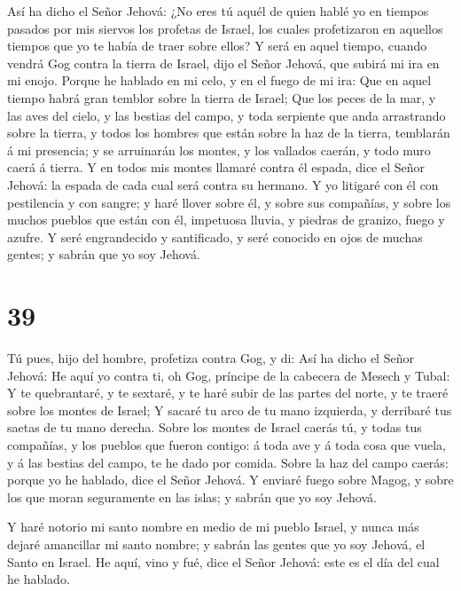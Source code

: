 Así ha dicho el Señor Jehová: ¿No eres tú aquél de quien
hablé yo en tiempos pasados por mis siervos los profetas de Israel, los
cuales profetizaron en aquellos tiempos que yo te había de traer sobre
ellos?  Y será en aquel tiempo, cuando vendrá Gog contra la
tierra de Israel, dijo el Señor Jehová, que subirá mi ira en mi enojo.
 Porque he hablado en mi celo, y en el fuego de mi ira: Que
en aquel tiempo habrá gran temblor sobre la tierra de Israel;
 Que los peces de la mar, y las aves del cielo, y las
bestias del campo, y toda serpiente que anda arrastrando sobre la
tierra, y todos los hombres que están sobre la haz de la tierra,
temblarán á mi presencia; y se arruinarán los montes, y los vallados
caerán, y todo muro caerá á tierra.  Y en todos mis montes
llamaré contra él espada, dice el Señor Jehová: la espada de cada cual
será contra su hermano.  Y yo litigaré con él con
pestilencia y con sangre; y haré llover sobre él, y sobre sus compañías,
y sobre los muchos pueblos que están con él, impetuosa lluvia, y piedras
de granizo, fuego y azufre.  Y seré engrandecido y
santificado, y seré conocido en ojos de muchas gentes; y sabrán que yo
soy Jehová.

\hypertarget{section-38}{%
\section{39}\label{section-38}}

 Tú pues, hijo del hombre, profetiza contra Gog, y di: Así
ha dicho el Señor Jehová: He aquí yo contra ti, oh Gog, príncipe de la
cabecera de Mesech y Tubal:  Y te quebrantaré, y te sextaré,
y te haré subir de las partes del norte, y te traeré sobre los montes de
Israel;  Y sacaré tu arco de tu mano izquierda, y derribaré
tus saetas de tu mano derecha.  Sobre los montes de Israel
caerás tú, y todas tus compañías, y los pueblos que fueron contigo: á
toda ave y á toda cosa que vuela, y á las bestias del campo, te he dado
por comida.  Sobre la haz del campo caerás: porque yo he
hablado, dice el Señor Jehová.  Y enviaré fuego sobre Magog,
y sobre los que moran seguramente en las islas; y sabrán que yo soy
Jehová.

 Y haré notorio mi santo nombre en medio de mi pueblo
Israel, y nunca más dejaré amancillar mi santo nombre; y sabrán las
gentes que yo soy Jehová, el Santo en Israel.  He aquí, vino
y fué, dice el Señor Jehová: este es el día del cual he hablado.

